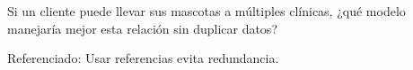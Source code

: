 \documentclass[10pt,a4paper,addpoints,answers]{exam}
\begin{document}
\begin{questions}
\begin{parts}
\begin{subparts}
\subpart Si un cliente puede llevar sus mascotas a múltiples clínicas, ¿qué modelo manejaría mejor esta relación sin duplicar datos?
\begin{solution}[10em]
Referenciado: Usar referencias evita redundancia.  
\end{solution}

\end{subparts}

\end{parts}

\end{questions}
\end{document}
